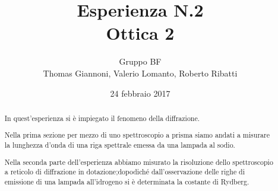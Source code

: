 \documentclass[11pt,a4paper]{article}
\author{Gruppo BF \\ \smallskip Thomas Giannoni, Valerio Lomanto, Roberto Ribatti}
\title{Esperienza N.2 \\ \smallskip Ottica 2}
\date{24 febbraio 2017}
\begin{document}
\maketitle

\begin{abstract}
In quest'esperienza si è impiegato il fenomeno della diffrazione.

Nella prima sezione per mezzo di uno 
spettroscopio a prisma 
siamo andati a misurare la 
lunghezza d'onda di una riga spettrale
emessa da una lampada al sodio.

Nella seconda parte dell'esperienza abbiamo misurato 
la risoluzione dello spettroscopio a reticolo di diffrazione
in dotazione;dopodiché dall'osservazione delle righe di 
emissione di una lampada all'idrogeno 
si è determinata la costante di Rydberg.

\end{abstract}

\tableofcontents %






%
\end{document}
